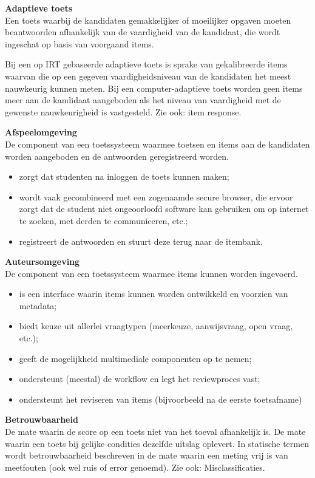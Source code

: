 \documentclass[
]{book}
\providecommand{\tightlist}{%
  \setlength{\itemsep}{0pt}\setlength{\parskip}{0pt}}
\begin{document}
\textbf{Adaptieve toets}\\
Een toets waarbij de kandidaten gemakkelijker of moeilijker opgaven moeten beantwoorden afhankelijk van de vaardigheid van de kandidaat, die wordt ingeschat op basis van voorgaand items.

Bij een op IRT gebaseerde adaptieve toets is sprake van gekalibreerde items waarvan die op een gegeven vaardigheidsniveau van de kandidaten het meest nauwkeurig kunnen meten. Bij een computer-adaptieve toets worden geen items meer aan de kandidaat aangeboden als het niveau van vaardigheid met de gewenste nauwkeurigheid is vastgesteld. Zie ook: item response.

\textbf{Afspeelomgeving}\\
De component van een toetssysteem waarmee toetsen en items aan de kandidaten worden aangeboden en de antwoorden geregistreerd worden.

\begin{itemize}
\tightlist
\item
  zorgt dat studenten na inloggen de toets kunnen maken;
\item
  wordt vaak gecombineerd met een zogenaamde secure browser, die ervoor zorgt dat de student niet ongeoorloofd software kan gebruiken om op internet te zoeken, met derden te communiceren, etc.;
\item
  registreert de antwoorden en stuurt deze terug naar de itembank.
\end{itemize}

\textbf{Auteursomgeving}\\
De component van een toetssysteem waarmee items kunnen worden ingevoerd.

\begin{itemize}
\tightlist
\item
  is een interface waarin items kunnen worden ontwikkeld en voorzien van metadata;
\item
  biedt keuze uit allerlei vraagtypen (meerkeuze, aanwijsvraag, open vraag, etc.);
\item
  geeft de mogelijkheid multimediale componenten op te nemen;
\item
  ondersteunt (meestal) de workflow en legt het reviewproces vast;
\item
  ondersteunt het reviseren van items (bijvoorbeeld na de eerste toetsafname)
\end{itemize}

\textbf{Betrouwbaarheid}\\
De mate waarin de score op een toets niet van het toeval afhankelijk is. De mate waarin een toets bij gelijke condities dezelfde uitslag oplevert. In statische termen wordt betrouwbaarheid beschreven in de mate waarin een meting vrij is van meetfouten (ook wel ruis of error genoemd).
Zie ook: Misclassificaties.
\end{document}
